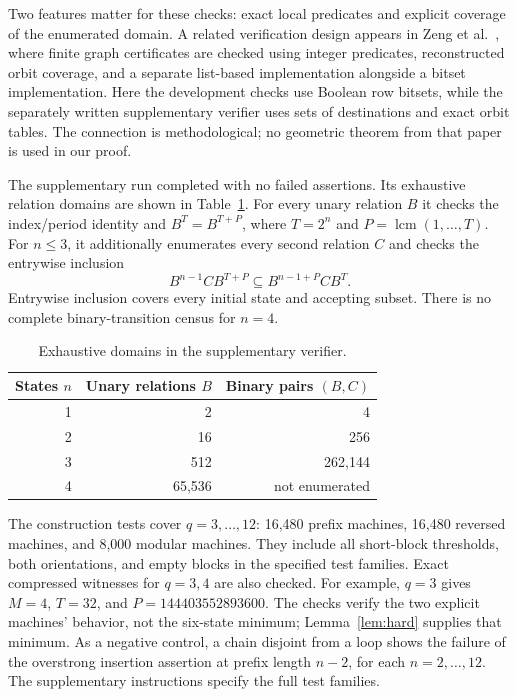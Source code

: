 \documentclass[11pt,a4paper]{article}
\DeclareMathOperator{\lcm}{lcm}
\begin{document}
Two features matter for these checks: exact local predicates and explicit
coverage of the enumerated domain. A related verification design appears
in Zeng et al.~\cite[Sections~3, 4 and 6]{zeng2026finite}, where finite
graph certificates are checked using integer predicates, reconstructed
orbit coverage, and a separate list-based implementation alongside a
bitset implementation. Here the development checks use Boolean row
bitsets, while the separately written supplementary verifier uses sets
of destinations and exact orbit tables. The connection is methodological;
no geometric theorem from that paper is used in our proof.

The supplementary run completed with no failed assertions.
Its exhaustive relation domains are shown in Table~\ref{tab:coverage}.
For every unary relation \(B\) it checks the index/period identity and
\(B^T=B^{T+P}\), where \(T=2^n\) and \(P=\lcm(1,\ldots,T)\).
For \(n\leq3\), it additionally enumerates every second relation \(C\)
and checks the entrywise inclusion
\begin{equation}\label{eq:diagnostic}
 B^{n-1}CB^{T+P}\subseteq B^{n-1+P}CB^T.
\end{equation}
Entrywise inclusion covers every initial state and accepting subset.
There is no complete binary-transition census for \(n=4\).

\begin{table}[ht]
\centering
\caption{Exhaustive domains in the supplementary verifier.}\label{tab:coverage}
\begin{tabular}{@{}rrr@{}}
\toprule
States \(n\) & Unary relations \(B\) & Binary pairs \((B,C)\)\\
\midrule
1 & 2 & 4\\
2 & 16 & 256\\
3 & 512 & 262,144\\
4 & 65,536 & not enumerated\\
\bottomrule
\end{tabular}
\end{table}

The construction tests cover \(q=3,\ldots,12\): 16,480 prefix machines,
16,480 reversed machines, and 8,000 modular machines.
They include all short-block thresholds, both orientations, and empty
blocks in the specified test families. Exact compressed witnesses for
\(q=3,4\) are also checked. For example, \(q=3\) gives
\(M=4\), \(T=32\), and \(P=144403552893600\).
The checks verify the two explicit machines' behavior, not the six-state
minimum; Lemma~\ref{lem:hard} supplies that minimum.
As a negative control, a chain disjoint from a loop shows the failure
of the overstrong insertion assertion at prefix length \(n-2\),
for each \(n=2,\ldots,12\).
The supplementary instructions specify the full test families.
\end{document}
